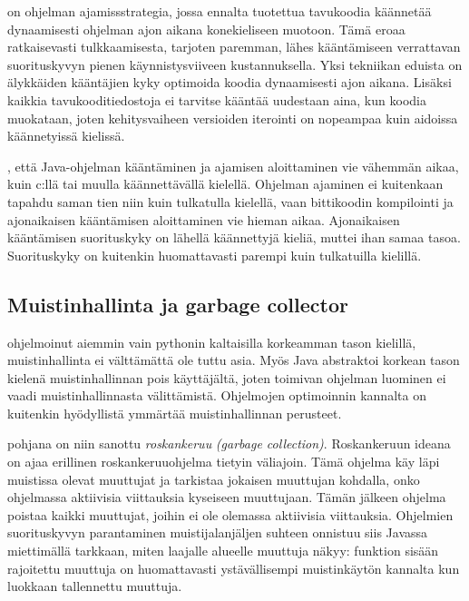 \documentclass[a4paper,justified,notoc]{tufte-book}
\newcommand{\eng}[1]{\textit{(#1)}}
\newcommand{\new}[1]{\textit{\gls{#1}}}
\newcommand{\neweng}[2]{\new{#1} \eng{#2}}
\begin{document}
\begin{fullwidth}
 on ohjelman ajamissstrategia, jossa ennalta tuotettua
tavukoodia käännetää dynaamisesti ohjelman ajon aikana konekieliseen muotoon. Tämä eroaa
ratkaisevasti tulkkaamisesta, tarjoten paremman, lähes kääntämiseen verrattavan suorituskyvyn
pienen käynnistysviiveen kustannuksella. Yksi tekniikan eduista on älykkäiden kääntäjien kyky
optimoida koodia dynaamisesti ajon aikana. Lisäksi kaikkia tavukooditiedostoja ei tarvitse kääntää
uudestaan aina, kun koodia muokataan, joten kehitysvaiheen versioiden iterointi on nopeampaa kuin
aidoissa käännetyissä kielissä.

, että Java-ohjelman kääntäminen ja ajamisen aloittaminen vie vähemmän
aikaa, kuin c:llä tai muulla käännettävällä kielellä. Ohjelman ajaminen ei kuitenkaan tapahdu
saman tien niin kuin tulkatulla kielellä, vaan bittikoodin kompilointi ja ajonaikaisen kääntämisen
aloittaminen vie hieman aikaa. Ajonaikaisen kääntämisen suorituskyky on lähellä käännettyjä
kieliä, muttei ihan samaa tasoa. Suorituskyky on kuitenkin huomattavasti parempi kuin tulkatuilla
kielillä.

\subsection{Muistinhallinta ja garbage collector}
\label{GC}

 ohjelmoinut aiemmin vain pythonin kaltaisilla korkeamman tason kielillä,
muistinhallinta ei välttämättä ole tuttu asia. Myös Java abstraktoi korkean tason kielenä
muistinhallinnan pois käyttäjältä, joten toimivan ohjelman luominen ei vaadi muistinhallinnasta
välittämistä. Ohjelmojen optimoinnin kannalta on kuitenkin hyödyllistä ymmärtää muistinhallinnan
perusteet.

 pohjana on niin sanottu
\neweng{roskankeruu}{garbage collection}. Roskankeruun ideana on ajaa erillinen roskankeruuohjelma
tietyin väliajoin. Tämä ohjelma käy läpi muistissa olevat muuttujat ja tarkistaa jokaisen
muuttujan kohdalla, onko ohjelmassa aktiivisia viittauksia kyseiseen muuttujaan. Tämän jälkeen
ohjelma poistaa kaikki muuttujat, joihin ei ole olemassa aktiivisia viittauksia. Ohjelmien
suorituskyvyn parantaminen muistijalanjäljen suhteen onnistuu siis Javassa miettimällä tarkkaan,
miten laajalle alueelle muuttuja näkyy: funktion sisään rajoitettu muuttuja on huomattavasti
ystävällisempi muistinkäytön kannalta kun luokkaan tallennettu muuttuja.


\end{fullwidth}
\end{document}
